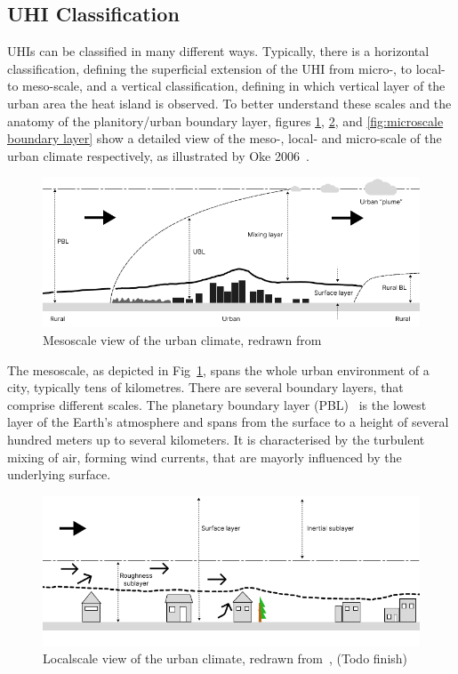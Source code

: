 \subsection{UHI Classification}

UHIs can be classified in many different ways. Typically, there is a horizontal classification, defining the superficial extension of the UHI from micro-, to local- to meso-scale, and a vertical classification, defining in which vertical layer of the urban area the heat island is observed. To better understand these scales and the anatomy of the planitory/urban boundary layer, figures \ref{fig:mesoscale boundary layer}, \ref{fig:localscale boundary layer}, and \ref{fig:microscale boundary layer} show a detailed view of the meso-, local- and micro-scale of the urban climate respectively, as illustrated by Oke 2006~\cite{oke2006guideline}.

\begin{figure}[h]
    \centering
    \includegraphics[width=\textwidth]{images/Mesoscale Boundary Layer.png}
    \caption{Mesoscale view of the urban climate, redrawn from~\cite{oke2006guideline}}
    \label{fig:mesoscale boundary layer}
\end{figure}

The mesoscale, as depicted in Fig~\ref{fig:mesoscale boundary layer}, spans the whole urban environment of a city, typically tens of kilometres. There are several boundary layers, that comprise different scales. The planetary boundary layer (PBL)~\cite{wyngaard1985structure} is the lowest layer of the Earth's atmosphere and spans from the surface to a height of several hundred meters up to several kilometers. It is characterised by the turbulent mixing of air, forming wind currents, that are mayorly influenced by the underlying surface.

\begin{figure}[h]
    \centering
    \includegraphics[width=\textwidth]{images/Localscale Boundary Layer.png}
    \caption{Localscale view of the urban climate, redrawn from~\cite{oke2006guideline}, (Todo finish)}
    \label{fig:localscale boundary layer}
\end{figure}

